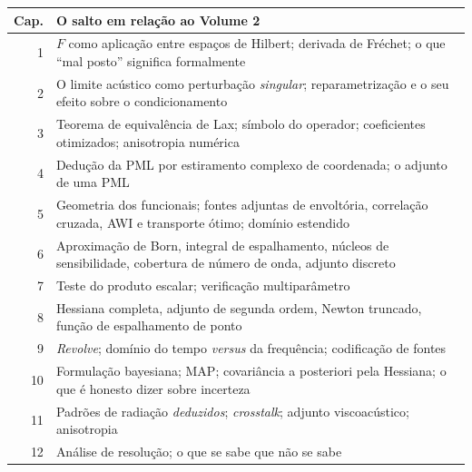 \documentclass[11pt,a4paper,oneside]{report}
\begin{document}
\begin{atencao}
\begin{center}
\begin{tabular}{@{}rp{12.4cm}@{}}
\toprule
\textbf{Cap.} & \textbf{O salto em rela\c{c}\~ao ao Volume 2} \\
\midrule
1 & $F$ como aplica\c{c}\~ao entre espa\c{c}os de Hilbert; derivada de
  Fr\'echet; o que ``mal posto'' significa formalmente \\
2 & O limite ac\'ustico como perturba\c{c}\~ao \emph{singular};
  reparametriza\c{c}\~ao e o seu efeito sobre o condicionamento \\
3 & Teorema de equival\^encia de Lax; s\'imbolo do operador; coeficientes
  otimizados; anisotropia num\'erica \\
4 & Dedu\c{c}\~ao da PML por estiramento complexo de coordenada; o adjunto de
  uma PML \\
5 & Geometria dos funcionais; fontes adjuntas de envolt\'oria,
  correla\c{c}\~ao cruzada, AWI e transporte \'otimo; dom\'inio estendido \\
6 & Aproxima\c{c}\~ao de Born, integral de espalhamento, n\'ucleos de
  sensibilidade, cobertura de n\'umero de onda, adjunto discreto \\
7 & Teste do produto escalar; verifica\c{c}\~ao multipar\^ametro \\
8 & Hessiana completa, adjunto de segunda ordem, Newton truncado,
  fun\c{c}\~ao de espalhamento de ponto \\
9 & \emph{Revolve}; dom\'inio do tempo \emph{versus} da frequ\^encia;
  codifica\c{c}\~ao de fontes \\
10 & Formula\c{c}\~ao bayesiana; MAP; covari\^ancia a posteriori pela
  Hessiana; o que \'e honesto dizer sobre incerteza \\
11 & Padr\~oes de radia\c{c}\~ao \emph{deduzidos}; \emph{crosstalk};
  adjunto viscoac\'ustico; anisotropia \\
12 & An\'alise de resolu\c{c}\~ao; o que se sabe que n\~ao se sabe \\
\bottomrule
\end{tabular}
\end{center}
\end{atencao}

\end{document}
